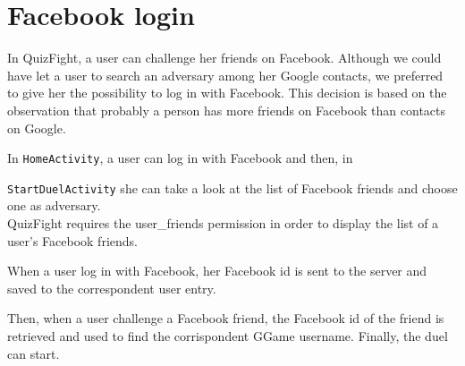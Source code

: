 \section{Facebook login}

In QuizFight, a user can challenge her friends on Facebook.
Although we could have let a user to search an adversary among her Google
contacts, we preferred to give her the possibility to log in with Facebook.
This decision is based on the observation that probably a person has more
friends on Facebook than contacts on Google.

In \texttt{HomeActivity}, a user can log in with Facebook and then, in

\texttt{StartDuelActivity} she can take a look at the list of
Facebook friends and choose one as adversary. \\

QuizFight requires the user\_friends permission in order to display the
list of a user's Facebook friends.

When a user log in with Facebook, her Facebook id is sent to the server and
saved to the correspondent user entry.

Then, when a user challenge a Facebook friend, the Facebook id of the friend
is retrieved and used to find the corrispondent GGame username.
Finally, the duel can start.
